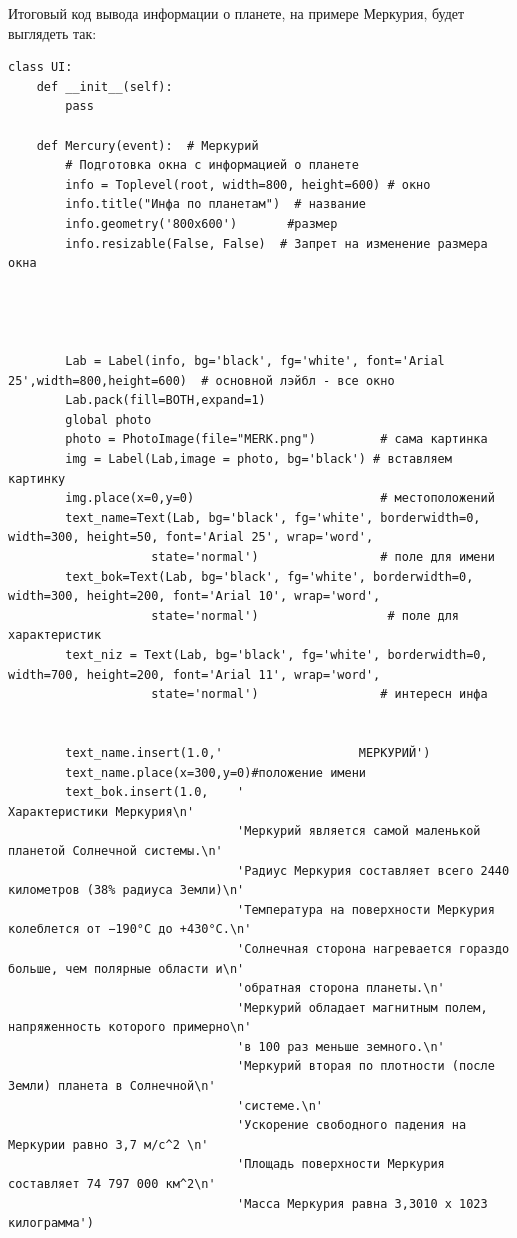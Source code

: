 \documentclass[11pt,a4paper]{report}
\begin{document}
\newpage
Итоговый код вывода информации о планете, на примере Меркурия, будет выглядеть так:
\begin{verbatim}
class UI:
    def __init__(self):
        pass

    def Mercury(event):  # Меркурий
        # Подготовка окна с информацией о планете
        info = Toplevel(root, width=800, height=600) # окно
        info.title("Инфа по планетам")  # название
        info.geometry('800x600')       #размер
        info.resizable(False, False)  # Запрет на изменение размера окна
        
        
        
    
        Lab = Label(info, bg='black', fg='white', font='Arial 25',width=800,height=600)  # основной лэйбл - все окно
        Lab.pack(fill=BOTH,expand=1)
        global photo
        photo = PhotoImage(file="MERK.png")         # сама картинка
        img = Label(Lab,image = photo, bg='black') # вставляем картинку
        img.place(x=0,y=0)                          # местоположений
        text_name=Text(Lab, bg='black', fg='white', borderwidth=0, width=300, height=50, font='Arial 25', wrap='word',
                    state='normal')                 # поле для имени
        text_bok=Text(Lab, bg='black', fg='white', borderwidth=0, width=300, height=200, font='Arial 10', wrap='word',
                    state='normal')                  # поле для характеристик
        text_niz = Text(Lab, bg='black', fg='white', borderwidth=0, width=700, height=200, font='Arial 11', wrap='word',
                    state='normal')                 # интересн инфа
    
       
        text_name.insert(1.0,'                   МЕРКУРИЙ')
        text_name.place(x=300,y=0)#положение имени
        text_bok.insert(1.0,    '                                           Характеристики Меркурия\n' 
                                'Меркурий является самой маленькой планетой Солнечной системы.\n'
                                'Радиус Меркурия составляет всего 2440 километров (38% радиуса Земли)\n'
                                'Температура на поверхности Меркурия колеблется от −190°C до +430°C.\n'
                                'Солнечная сторона нагревается гораздо больше, чем полярные области и\n'
                                'обратная сторона планеты.\n'
                                'Меркурий обладает магнитным полем, напряженность которого примерно\n' 
                                'в 100 раз меньше земного.\n'
                                'Меркурий вторая по плотности (после Земли) планета в Солнечной\n'
                                'системе.\n'
                                'Ускорение свободного падения на Меркурии равно 3,7 м/c^2 \n'
                                'Площадь поверхности Меркурия составляет 74 797 000 км^2\n' 
                                'Масса Меркурия равна 3,3010 х 1023 килограмма')
        

\end{verbatim}
\end{document}
